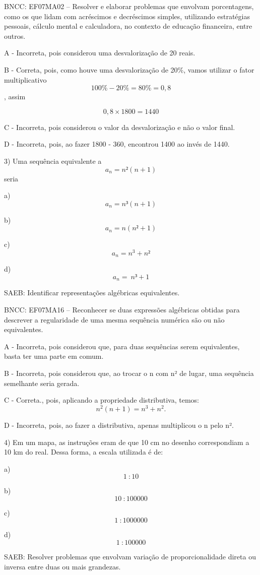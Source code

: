 BNCC: EF07MA02 -- Resolver e elaborar problemas que envolvam
porcentagens, como os que lidam com acréscimos e decréscimos simples,
utilizando estratégias pessoais, cálculo mental e calculadora, no
contexto de educação financeira, entre outros.

A - Incorreta, pois considerou uma desvalorização de 20 reais.

B - Correta, pois, como houve uma desvalorização de 20\%, vamos utilizar
o fator multiplicativo \[100\% - 20\% = 80\% = 0,8\], assim

\[0,8 \times 1800 = 1440\]

C - Incorreta, pois considerou o valor da desvalorização e não o valor
final.

D - Incorreta, pois, ao fazer 1800 - 360, encontrou 1400 ao invés de
1440.

3) Uma sequência equivalente a \[a_{n} = n²(n + 1)\] seria

a) \[a_{n} = n³(n + 1)\]

b) \[a_{n} = n(n² + 1)\]

c) \[a_{n} = n^{3} + n²\]

d) \[a_{n} = \ n³ + 1\]

SAEB: Identificar representações algébricas equivalentes.

BNCC: EF07MA16 -- Reconhecer se duas expressões algébricas obtidas para
descrever a regularidade de uma mesma sequência numérica são ou não
equivalentes.

A - Incorreta, pois considerou que, para duas sequências serem
equivalentes, basta ter uma parte em comum.

B - Incorreta, pois considerou que, ao trocar o n com n² de lugar, uma
sequência semelhante seria gerada.

C - Correta., pois, aplicando a propriedade distributiva, temos:
\[n^{2}\left( n + 1 \right) = n^{3} + n^{2}.\]

D - Incorreta, pois, ao fazer a distributiva, apenas multiplicou o n
pelo n².

4) Em um mapa, as instruções eram de que 10 cm no desenho correspondiam
a 10 km do real. Dessa forma, a escala utilizada é de:

a) \[1\ :10\]

b) \[10\ :100000\]

c) \[1\ :1000000\]

d) \[1\ :100000\]

SAEB: Resolver problemas que envolvam variação de proporcionalidade
direta ou inversa entre duas ou mais grandezas.

